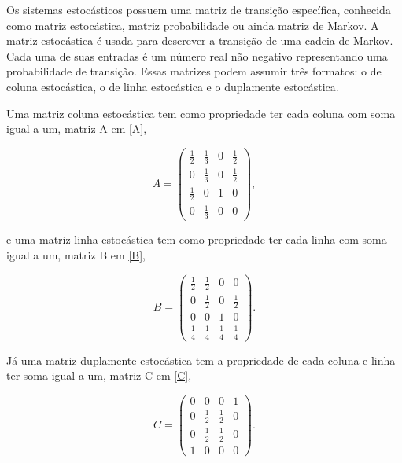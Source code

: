 Os sistemas estocásticos possuem uma matriz de transição específica, conhecida como matriz estocástica, matriz probabilidade ou ainda matriz de Markov. A matriz estocástica é usada para descrever a transição de uma cadeia de Markov. Cada uma de suas entradas é um número real não negativo representando uma probabilidade de transição. Essas matrizes podem assumir três formatos: o de coluna estocástica, o de linha estocástica e o duplamente estocástica. 

Uma matriz coluna estocástica tem como propriedade ter cada coluna com soma igual a um, matriz A em \eqref{A},


\begin{equation}\label{A}
A = \begin{pmatrix} 
 		\frac{1}{2}	&	\frac{1}{3}	&	0	&	\frac{1}{2}\\
 			0		&	\frac{1}{3}	& 	0	&	\frac{1}{2}\\
 		\frac{1}{2}	&	0			&	1	&	0\\
 			0		&	\frac{1}{3}	&	0	&	0
		\end{pmatrix},
\end{equation}

\noindent e uma matriz linha estocástica tem como propriedade ter cada linha com soma igual a um, matriz B em \eqref{B},

\begin{equation}\label{B}
B = \begin{pmatrix}
 		\frac{1}{2}	&	\frac{1}{2}	&	0			&	0\\
 			0		&	\frac{1}{2}	&	0			&	\frac{1}{2}\\
 			0		&	0			&	1			& 	0\\
 		\frac{1}{4}	&	\frac{1}{4}	&	\frac{1}{4}	&	\frac{1}{4}
		\end{pmatrix}.
\end{equation} 

\noindent Já uma matriz duplamente estocástica tem a propriedade de cada coluna e linha ter soma igual a um, matriz C em \eqref{C},

\begin{equation}\label{C}
C = \begin{pmatrix}
 		 0	&	0			&	0			& 1 \\
 		 0	&	\frac{1}{2}	&	\frac{1}{2}	& 0 \\
 		 0	&	\frac{1}{2}	&	\frac{1}{2}	& 0 \\
 		 1	&	0			&	0			& 0
		\end{pmatrix}.
\end{equation}

